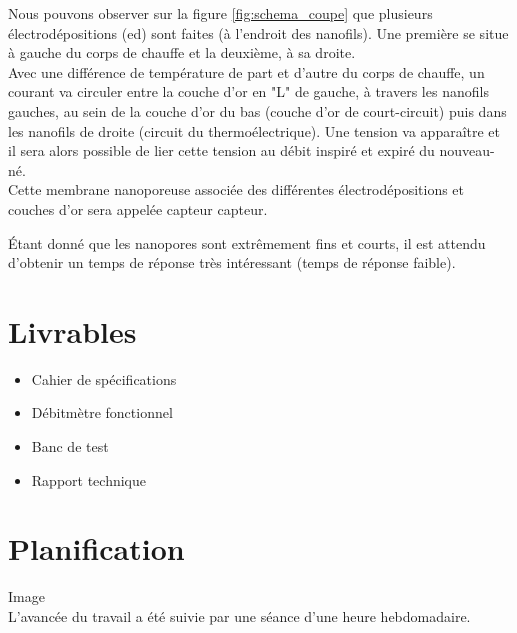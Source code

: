 Nous pouvons observer sur la figure \ref{fig:schema_coupe} que plusieurs électrodépositions (\gls{ed}) sont faites (à l'endroit des nanofils). Une première 
se situe à gauche du corps de chauffe et la deuxième, à sa droite. \\
Avec une différence de température de part et d'autre du corps de chauffe, un courant va circuler entre la couche d'or en "L" de gauche, à 
travers les nanofils gauches, au sein de la couche d'or du bas (couche d'or de court-circuit) puis dans les nanofils de droite (circuit du thermoélectrique). 
Une tension va apparaître et il sera alors possible de lier cette tension au débit inspiré et expiré du nouveau-né.\\
Cette membrane nanoporeuse associée des différentes électrodépositions et couches d'or sera appelée capteur \gls{capteur}. 

Étant donné que les nanopores sont extrêmement fins et courts, il est attendu d'obtenir un temps de réponse très intéressant (temps 
de réponse faible). 

\section{Livrables}
\begin{itemize}
    \item Cahier de spécifications
    \item Débitmètre fonctionnel
    \item Banc de test
    \item Rapport technique
\end{itemize}
\section{Planification}
Image\\

L'avancée du travail a été suivie par une séance d'une heure hebdomadaire. 

